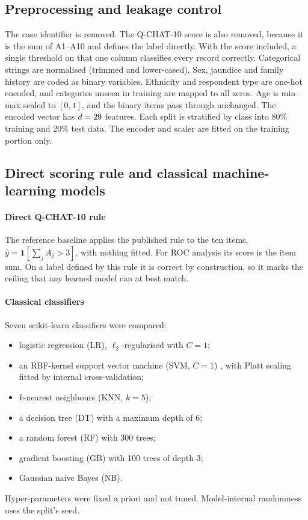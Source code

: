 \documentclass[5p,times,twocolumn]{elsarticle}
\begin{document}
\subsection{Preprocessing and leakage control}
\label{sec:prep}

The case identifier is removed. The Q-CHAT-10 score is also removed, because it is the sum of A1--A10 and defines the label directly. With the score included, a single threshold on that one column classifies every record correctly. Categorical strings are normalised (trimmed and lower-cased). Sex, jaundice and family history are coded as binary variables. Ethnicity and respondent type are one-hot encoded, and categories unseen in training are mapped to all zeros. Age is min--max scaled to $[0,1]$, and the binary items pass through unchanged. The encoded vector has $d=29$ features. Each split is stratified by class into 80\% training and 20\% test data. The encoder and scaler are fitted on the training portion only.

\subsection{Direct scoring rule and classical machine-learning models}
\label{sec:ml}

\paragraph{Direct Q-CHAT-10 rule} The reference baseline applies the published rule to the ten items, $\hat y=\mathbf{1}[\sum_{j}A_j>3]$, with nothing fitted. For ROC analysis its score is the item sum. On a label defined by this rule it is correct by construction, so it marks the ceiling that any learned model can at best match.

\paragraph{Classical classifiers} Seven scikit-learn \cite{pedregosa2011} classifiers were compared:
\begin{itemize}
\item logistic regression (LR), $\ell_2$-regularised with $C{=}1$;
\item an RBF-kernel support vector machine (SVM, $C{=}1$) \cite{cortes1995}, with Platt scaling \cite{platt1999} fitted by internal cross-validation;
\item $k$-nearest neighbours (KNN, $k{=}5$);
\item a decision tree (DT) with a maximum depth of 6;
\item a random forest (RF) \cite{breiman2001} with 300 trees;
\item gradient boosting (GB) \cite{friedman2001} with 100 trees of depth 3;
\item Gaussian naive Bayes (NB).
\end{itemize}
Hyper-parameters were fixed a priori and not tuned. Model-internal randomness uses the split's seed.
\end{document}
